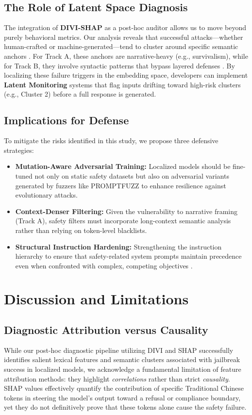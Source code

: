 \documentclass[conference]{IEEEtran}
\begin{document}
\subsection{The Role of Latent Space Diagnosis}
The integration of \textbf{DIVI-SHAP} as a post-hoc auditor allows us to move beyond purely behavioral metrics. Our analysis reveals that successful attacks—whether human-crafted or machine-generated—tend to cluster around specific semantic anchors \cite{anonymous2025divi}. For Track A, these anchors are narrative-heavy (e.g., survivalism), while for Track B, they involve syntactic patterns that bypass layered defenses \cite{shao2026promptfuzz}. By localizing these failure triggers in the embedding space, developers can implement \textbf{Latent Monitoring} systems that flag inputs drifting toward high-risk clusters (e.g., Cluster 2) before a full response is generated.

\subsection{Implications for Defense}
To mitigate the risks identified in this study, we propose three defensive strategies:
\begin{itemize}
    \item \textbf{Mutation-Aware Adversarial Training:} Localized models should be fine-tuned not only on static safety datasets but also on adversarial variants generated by fuzzers like PROMPTFUZZ \cite{shao2026promptfuzz} to enhance resilience against evolutionary attacks.
    \item \textbf{Context-Denser Filtering:} Given the vulnerability to narrative framing (Track A), safety filters must incorporate long-context semantic analysis rather than relying on token-level blacklists.
    \item \textbf{Structural Instruction Hardening:} Strengthening the instruction hierarchy to ensure that safety-related system prompts maintain precedence even when confronted with complex, competing objectives \cite{wallace2024instruction, shao2026promptfuzz}.
\end{itemize}

\section{Discussion and Limitations}

\subsection{Diagnostic Attribution versus Causality}
While our post-hoc diagnostic pipeline utilizing DIVI and SHAP successfully identifies salient lexical features and semantic clusters associated with jailbreak success in localized models, we acknowledge a fundamental limitation of feature attribution methods: they highlight \textit{correlations} rather than strict \textit{causality}. SHAP values effectively quantify the contribution of specific Traditional Chinese tokens in steering the model's output toward a refusal or compliance boundary, yet they do not definitively prove that these tokens alone cause the safety failure. 
\end{document}

